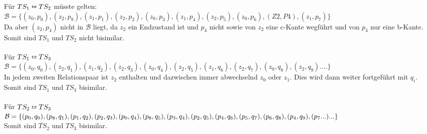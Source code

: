\documentclass[a4paper,12pt]{scrartcl}
\begin{document}
\subsubsection{}
Für $TS_1 \leftrightarroweq TS_2$ müsste gelten:\\
$\mathcal{B} = \{(z_0,p_0),(z_2,p_8),(z_1,p_1),(z_2,p_2),(z_0,p_3),(z_1,p_4),(z_2,p_5),(z_0,p_6),(Z2,P4),(z_1,p_7)\}$\\
Da aber $(z_2,p_4)$ nicht in $\mathcal{B}$ liegt, da $z_2$ ein Endzustand ist und $p_4$ nicht sowie von $z_2$ eine c-Kante wegführt und von $p_4$ nur eine b-Kante. Somit sind $TS_1$ und $TS_2$ nicht bisimilar.\\\\
Für $TS_1 \leftrightarroweq TS_3$\\
$\mathcal{B} = \{(z_0,q_0),(z_2,q_1),(z_1,q_2),(z_2,q_3),(z_0,q_4),(z_2,q_5),(z_1,q_6),(z_2,q_7),(z_0,q_8),(z_2,q_9)....\}$\\
In jedem zweiten Relationspaar ist $z_2$ enthalten und dazwischen immer abwechselnd $z_0$ oder $z_1$. Dies wird dann weiter fortgeführt mit $q_i$.
Somit sind $TS_1$ und $TS_3$ bisimilar.\\\\
Für $TS_2 \leftrightarroweq TS_3$\\
$\mathcal{B} = \{(p_0,q_0),(p_8,q_1),(p_1,q_2),(p_2,q_3),(p_0,q_4),(p_8,q_5),(p_3,q_4),(p_2,q_5),(p_4,q_6)\\,(p_5,q_7),(p_6,q_8),(p_4,q_9),(p_7...)...\}$\\
Somit sind $TS_2$ und $TS_3$ bisimilar.\\\\
\end{document}
